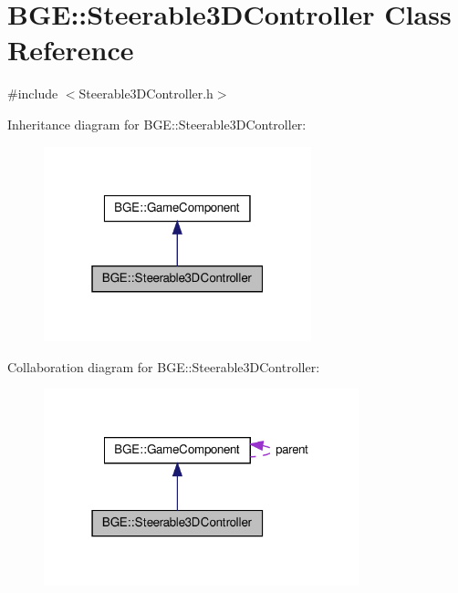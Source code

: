 \hypertarget{class_b_g_e_1_1_steerable3_d_controller}{\section{B\-G\-E\-:\-:Steerable3\-D\-Controller Class Reference}
\label{class_b_g_e_1_1_steerable3_d_controller}
}


{\ttfamily \#include $<$Steerable3\-D\-Controller.\-h$>$}



Inheritance diagram for B\-G\-E\-:\-:Steerable3\-D\-Controller\-:
\nopagebreak
\begin{figure}[H]
\begin{center}
\leavevmode
\includegraphics[width=220pt]{class_b_g_e_1_1_steerable3_d_controller__inherit__graph}
\end{center}
\end{figure}


Collaboration diagram for B\-G\-E\-:\-:Steerable3\-D\-Controller\-:
\nopagebreak
\begin{figure}[H]
\begin{center}
\leavevmode
\includegraphics[width=259pt]{class_b_g_e_1_1_steerable3_d_controller__coll__graph}
\end{center}
\end{figure}

